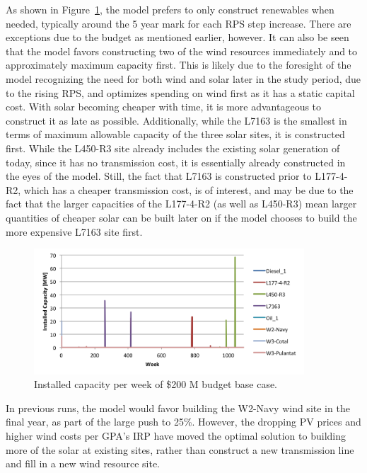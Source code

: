 \documentclass[12pt,letterpaper,fleqn]{article}
\begin{document}
As shown in Figure~\ref{fig:installed}, the model prefers to only
construct renewables when needed, typically around the 5 year mark for
each RPS step increase. There are exceptions due to the budget as
mentioned earlier, however. It can also be seen that the model favors
constructing two of the wind resources immediately and to
approximately maximum capacity first. This is likely due to the
foresight of the model recognizing the need for both wind and solar
later in the study period, due to the rising RPS, and optimizes
spending on wind first as it has a static capital cost. With solar
becoming cheaper with time, it is more advantageous to construct it as
late as possible. Additionally, while the L7163 is the smallest in
terms of maximum allowable capacity of the three solar sites, it is
constructed first. While the L450-R3 site already includes the
existing solar generation of today, since it has no transmission cost,
it is essentially already constructed in the eyes of the model. Still,
the fact that L7163 is constructed prior to L177-4-R2, which has a
cheaper transmission cost, is of interest, and may be due to the fact
that the larger capacities of the L177-4-R2 (as well as L450-R3) mean
larger quantities of cheaper solar can be built later on if the model
chooses to build the more expensive L7163 site first.

\begin{figure}[!h]
  \centering
  \includegraphics[width=0.9\textwidth]{img/installed}
  \caption{Installed capacity per week of \$200 M budget base case.}
  \label{fig:installed}
\end{figure}

In previous runs, the model would favor building the W2-Navy wind site
in the final year, as part of the large push to 25\%. However, the
dropping PV prices and higher wind costs per GPA’s IRP have moved the
optimal solution to building more of the solar at existing sites,
rather than construct a new transmission line and fill in a new wind
resource site. 
\end{document}
